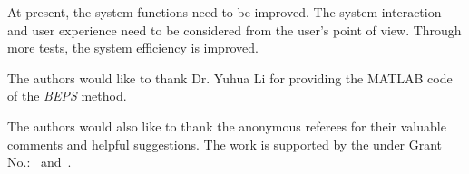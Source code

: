 At present, the system functions need to be improved. The system interaction and user experience need to be considered from the user's point of view. Through more tests, the system efficiency is improved.


\begin{acks}
	The authors would like to thank Dr. Yuhua Li for providing the
	MATLAB code of the \textit{BEPS} method.
	
	The authors would also like to thank the anonymous referees for
	their valuable comments and helpful suggestions. The work is
	supported by the  under Grant
	No.:~
	and~.
	
\end{acks}
